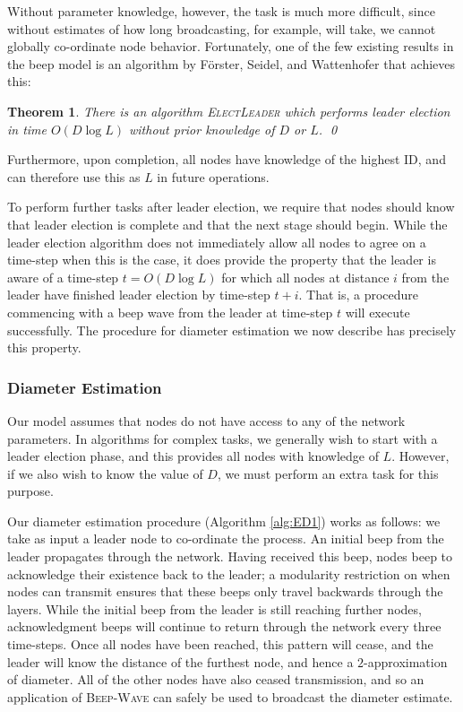 \documentclass{article}
\newtheorem{theorem}{Theorem}
\begin{document}
Without parameter knowledge, however, the task is much more difficult, since without estimates of how long broadcasting, for example, will take, we cannot globally co-ordinate node behavior. Fortunately, one of the few existing results in the beep model is an algorithm by F\"orster, Seidel, and Wattenhofer \cite{-FSW14} that achieves this:

\begin{theorem}
	There is an algorithm \textsc{ElectLeader} which performs leader election in time $O(D \log L)$ without prior knowledge of $D$ or $L$. \qed
\end{theorem}

Furthermore, upon completion, all nodes have knowledge of the highest ID, and can therefore use this as $L$ in future operations.

To perform further tasks after leader election, we require that nodes should know that leader election is complete and that the next stage should begin. While the leader election algorithm \cite{-FSW14} does not immediately allow all nodes to agree on a time-step when this is the case, it does provide the property that the leader is aware of a time-step $t=O(D\log L)$ for which all nodes at distance $i$ from the leader have finished leader election by time-step $t+i$. That is, a procedure commencing with a beep wave from the leader at time-step $t$ will execute successfully. The procedure for diameter estimation we now describe has precisely this property.

\subsubsection{Diameter Estimation}

Our model assumes that nodes do not have access to any of the network parameters. In algorithms for complex tasks, we generally wish to start with a leader election phase, and this provides all nodes with knowledge of $L$. However, if we also wish to know the value of $D$, we must perform an extra task for this purpose.

Our diameter estimation procedure (Algorithm \ref{alg:ED1}) works as follows: we take as input a leader node to co-ordinate the process. An initial beep from the leader propagates through the network. Having received this beep, nodes beep to acknowledge their existence back to the leader; a modularity restriction on when nodes can transmit ensures that these beeps only travel backwards through the layers. While the initial beep from the leader is still reaching further nodes, acknowledgment beeps will continue to return through the network every three time-steps. Once all nodes have been reached, this pattern will cease, and the leader will know the distance of the furthest node, and hence a $2$-approximation of diameter. All of the other nodes have also ceased transmission, and so an application of \textsc{Beep-Wave} can safely be used to broadcast the diameter estimate.
\end{document}
